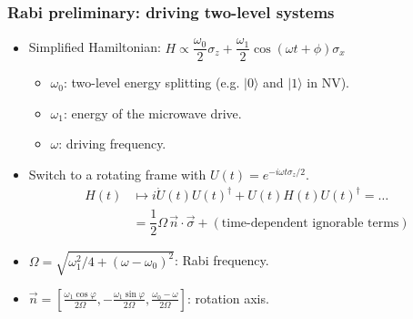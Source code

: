 \documentclass{beamer}
\begin{document}

\begin{frame}
    \frametitle{Rabi preliminary: driving two-level systems}
    \begin{itemize}
        \item Simplified Hamiltonian: $H \propto \dfrac{\omega_0}{2} \sigma_z + \dfrac{\omega_1}{2} \cos(\omega t + \phi) \sigma_x$
        \begin{itemize}
            \item $\omega_0$: two-level energy splitting (e.g. $|0\rangle$ and $|1\rangle$ in NV). 
            \item $\omega_1$: energy of the microwave drive. 
            \item $\omega$: driving frequency. 
        \end{itemize}

        \item Switch to a rotating frame with $U(t) = e^{-i\omega t \sigma_z/2}$. 
        \begin{align*}
            H(t) 
            &\mapsto i \dot U(t)U(t)^\dag + U(t) H(t) U(t)^\dag = \dots \\ 
            &= \dfrac 1 2 \Omega \, \vec n\cdot \vec \sigma + (\text{time-dependent ignorable terms})
        \end{align*}
        \item $\Omega = \sqrt{\omega_1^2/4 + (\omega - \omega_0)^2}$: Rabi frequency. 
        \item $\vec{n} = \left[\frac{\omega_1 \cos \varphi}{2\Omega}, -\frac{\omega_1 \sin \varphi}{2\Omega}, \frac{\omega_0-\omega}{2\Omega}\right]$: rotation axis. 
    \end{itemize}
\end{frame}
\end{document}

